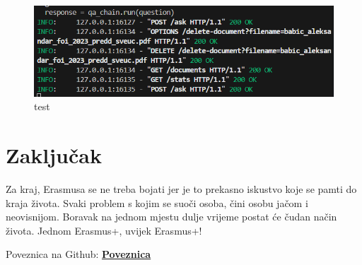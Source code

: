 \documentclass[]{foi}
\begin{document}
\begin{figure}[ht]
  \centering
  \includegraphics[width=1\textwidth]{./assets/statzs.png}
  \caption{test}
  \label{fig:slika101}
\end{figure}

\chapter{Zaključak}











Za kraj, Erasmusa se ne treba bojati jer je to prekasno iskustvo koje se pamti do kraja života. Svaki problem s kojim se suoči osoba, čini osobu jačom i neovisnijom. 
Boravak na jednom mjestu dulje vrijeme postat će čudan način života. Jednom Erasmus+, uvijek Erasmus+!

Poveznica na Github: \href{https://github.com/ababic20/Website-with-a-chatbot.git}{\textbf{Poveznica}} 

\makebackmatter
\end{document}
